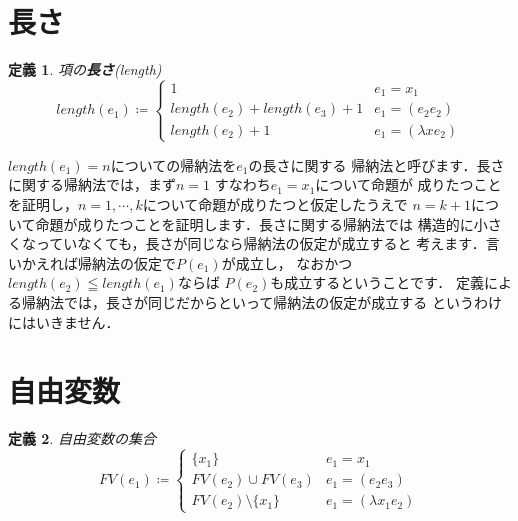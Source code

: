 \documentclass{ltjsbook}%
\newtheorem{definition}{定義}[section]%
\newcommand\term[2]{\textbf{#1}{(\textit{#2})}}%
\begin{document}
\section{長さ}%
\label{sect:length}%
\begin{definition}%
項の\term{長さ}{length}%
\begin{equation}%
  length(\mathit{e}_1) \coloneqq \begin{cases}%
    1 & \mathit{e}_1 = \mathit{x}_1\\%
    length(\mathit{e}_2) + length(\mathit{e}_3) + 1%
    & \mathit{e}_1 = (\mathit{e}_2\mathit{e}_2)\\%
    length(\mathit{e}_2) + 1 & \mathit{e}_1 = (\lambda\mathit{x}\mathit{e}_2)%
  \end{cases}%
\end{equation}%
\end{definition}%
\par$length(\mathit{e}_1)=n$についての帰納法を$\mathit{e}_1$の長さに関する%
帰納法と呼びます．長さに関する帰納法では，まず$n = 1$%
すなわち$\mathit{e}_1 = \mathit{x}_1$について命題が%
成りたつことを証明し，$n = 1,\cdots,k$について命題が成りたつと仮定したうえで%
$n = k + 1$について命題が成りたつことを証明します．長さに関する帰納法では%
構造的に小さくなっていなくても，長さが同じなら帰納法の仮定が成立すると%
考えます．言いかえれば帰納法の仮定で$P(\mathit{e}_1)$が成立し，%
なおかつ$length(\mathit{e}_2)\leqq length(\mathit{e}_1)$ならば%
$P(\mathit{e}_2)$も成立するということです．%
定義による帰納法では，長さが同じだからといって帰納法の仮定が成立する%
というわけにはいきません．
\section{自由変数}%
\label{untyped:fv}%
\begin{definition}%
自由変数の集合%
\begin{equation}%
  FV(\mathit{e}_1) \coloneqq \begin{cases}%
    \{\mathit{x}_1\} & \mathit{e}_1 = \mathit{x}_1\\%
    FV(\mathit{e}_2)\cup FV(\mathit{e}_3)%
    & \mathit{e}_1 = (\mathit{e}_2\mathit{e}_3)\\%
    FV(\mathit{e}_2)\setminus\{\mathit{x}_1\}%
    & \mathit{e}_1 = (\lambda\mathit{x}_1\mathit{e}_2)%
  \end{cases}%
\end{equation}%
\end{definition}%
\end{document}
